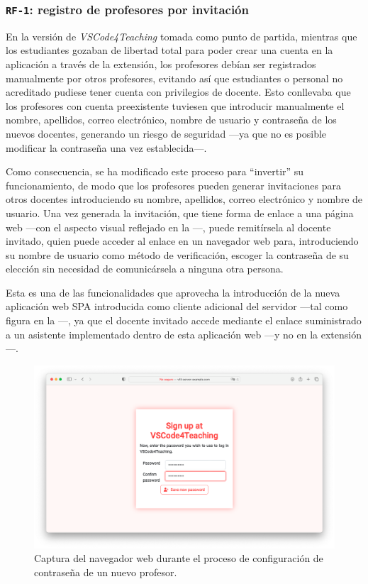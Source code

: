 \subsubsection{\texttt{RF-1}: registro de profesores por invitación}
\label{subsec:rf1}

En la versión de \textit{VSCode4Teaching} tomada como punto de partida, mientras que los estudiantes gozaban de libertad total para poder crear una cuenta en la aplicación a través de la extensión, los profesores debían ser registrados manualmente por otros profesores, evitando así que estudiantes o personal no acreditado pudiese tener cuenta con privilegios de docente. Esto conllevaba que los profesores con cuenta preexistente tuviesen que introducir manualmente el nombre, apellidos, correo electrónico, nombre de usuario y contraseña de los nuevos docentes, generando un riesgo de seguridad ---ya que no es posible modificar la contraseña una vez establecida---.

Como consecuencia, se ha modificado este proceso para ``invertir'' su funcionamiento, de modo que los profesores pueden generar invitaciones para otros docentes introduciendo su nombre, apellidos, correo electrónico y nombre de usuario. Una vez generada la invitación, que tiene forma de enlace a una página web ---con el aspecto visual reflejado en la ---, puede remitírsela al docente invitado, quien puede acceder al enlace en un navegador web para, introduciendo su nombre de usuario como método de verificación, escoger la contraseña de su elección sin necesidad de comunicársela a ninguna otra persona.

Esta es una de las funcionalidades que aprovecha la introducción de la nueva aplicación web SPA introducida como cliente adicional del servidor ---tal como figura en la ---, ya que el docente invitado accede mediante el enlace suministrado a un asistente implementado dentro de esta aplicación web ---y no en la extensión---.

\begin{figure}[ht]
    \centering
    \includegraphics[width=\textwidth]{imagenes/utilizadas/4-3-implementacion/rf1-1.png}
    \caption{Captura del navegador web durante el proceso de configuración de contraseña de un nuevo profesor.}
    \label{fig:reqf1-1}
\end{figure}
